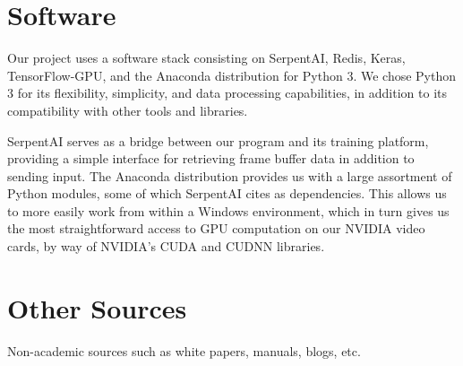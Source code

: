 \section{Software}

Our project uses a software stack consisting on SerpentAI, Redis, Keras, TensorFlow-GPU, and the Anaconda distribution for Python 3.
We chose Python 3 for its flexibility, simplicity, and data processing capabilities, in addition to its compatibility with other tools and libraries. 


SerpentAI serves as a bridge between our program and its training platform, providing a simple interface for retrieving frame buffer data in addition to sending input. The Anaconda distribution provides us with a large assortment of Python modules, some of which SerpentAI cites as dependencies. This allows us to more easily work from within a Windows environment, which in turn gives us the most straightforward access to GPU computation on our NVIDIA video cards, by way of NVIDIA's CUDA and CUDNN libraries.




\section{Other Sources}

Non-academic sources such as white papers, manuals, blogs, etc.

